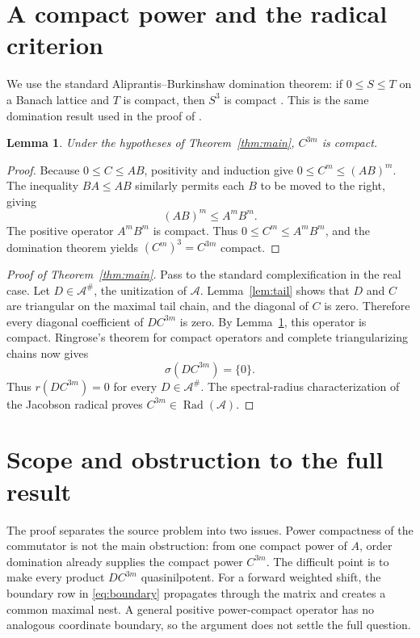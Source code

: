 \documentclass[11pt]{article}
\newtheorem{lemma}[theorem]{Lemma}
\newcommand{\Rad}{\operatorname{Rad}}
\begin{document}
\section{A compact power and the radical criterion}

We use the standard Aliprantis--Burkinshaw domination theorem: if
$0\leq S\leq T$ on a Banach lattice and $T$ is compact, then $S^3$ is
compact \cite[Theorem~5.14]{AB}.  This is the same domination result used in
the proof of \cite[Corollary~3.2]{D}.

\begin{lemma}\label{lem:compact}
Under the hypotheses of Theorem~\ref{thm:main}, $C^{3m}$ is compact.
\end{lemma}

\begin{proof}
Because $0\leq C\leq AB$, positivity and induction give
$0\leq C^m\leq(AB)^m$.  The inequality $BA\leq AB$ similarly permits each
$B$ to be moved to the right, giving
\[
                         (AB)^m\leq A^mB^m.
\]
The positive operator $A^mB^m$ is compact.  Thus
$0\leq C^m\leq A^mB^m$, and the domination theorem yields
$(C^m)^3=C^{3m}$ compact.
\end{proof}

\begin{proof}[Proof of Theorem~\ref{thm:main}]
Pass to the standard complexification in the real case.  Let
$D\in\mathcal A^\#$, the unitization of $\mathcal A$.  Lemma~\ref{lem:tail}
shows that $D$ and $C$ are triangular on the maximal tail chain, and the
diagonal of $C$ is zero.  Therefore every diagonal coefficient of
$DC^{3m}$ is zero.  By Lemma~\ref{lem:compact}, this operator is compact.
Ringrose's theorem for compact operators and complete triangularizing chains
now gives
\[
                         \sigma(DC^{3m})=\{0\}.
\]
Thus $r(DC^{3m})=0$ for every $D\in\mathcal A^\#$.  The spectral-radius
characterization of the Jacobson radical proves
$C^{3m}\in\Rad(\mathcal A)$.
\end{proof}

\section{Scope and obstruction to the full result}

The proof separates the source problem into two issues.  Power compactness of
the commutator is not the main obstruction: from one compact power of $A$,
order domination already supplies the compact power $C^{3m}$.  The difficult
point is to make every product $DC^{3m}$ quasinilpotent.  For a forward
weighted shift, the boundary row in \eqref{eq:boundary} propagates through
the matrix and creates a common maximal nest.  A general positive
power-compact operator has no analogous coordinate boundary, so the argument
does not settle the full question.
\end{document}
